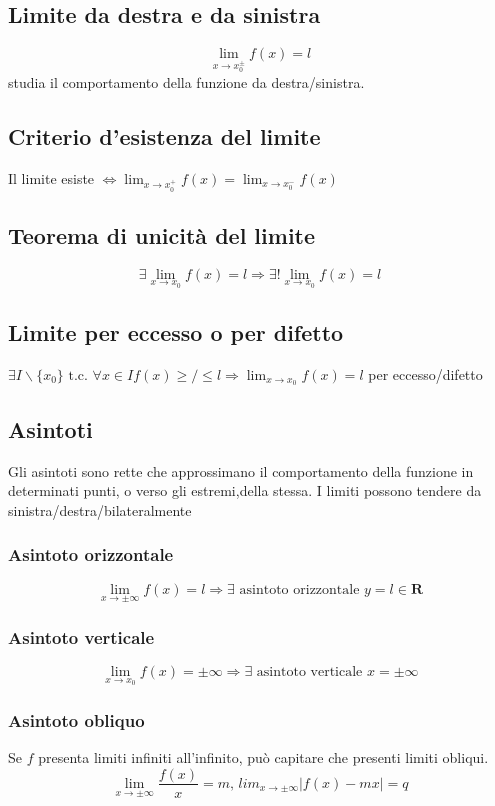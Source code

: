 \documentclass{report}
\begin{document}
    \subsection{Limite da destra e da sinistra}
        $$\lim_{x \to x_0^{\pm}} f\left(x\right) = l$$ studia il comportamento
        della funzione da destra/sinistra.
    \subsection{Criterio d'esistenza del limite}
        Il limite esiste $
            \Longleftrightarrow \lim_{x \to x_0^+} f\left(x\right) = \lim_{x \to x_0^-} f\left(x\right)
        $
    \subsection{Teorema di unicità del limite}
        $$\exists \lim_{x \to x_0} f\left(x\right) = l \Longrightarrow \exists! \lim_{x \to x_0} f\left(x\right) = l$$
    \subsection{Limite per eccesso o per difetto}
        $\exists I\backslash\{x_0\} \textrm{ t.c. } \forall x \in I f\left(x\right) \geq/\leq l \Longrightarrow 
            \lim_{x \to x_0} f\left(x\right) = l$ per eccesso/difetto 
    \subsection{Asintoti}
        Gli asintoti sono rette che approssimano il comportamento della funzione in determinati punti, o verso gli estremi,della stessa.
        I limiti possono tendere da sinistra/destra/bilateralmente
        \subsubsection{Asintoto orizzontale}
            $$\lim_{x \to \pm \infty} f\left(x\right) = l \Longrightarrow \exists \textrm{ asintoto orizzontale } y = l \in \mathbf{R}$$
        \subsubsection{Asintoto verticale}
            $$\lim_{x \to x_0} f\left(x\right) = \pm \infty \Longrightarrow \exists \textrm{ asintoto verticale } x = \pm \infty$$
        \subsubsection{Asintoto obliquo}
            Se $f$ presenta limiti infiniti all'infinito, può capitare che presenti limiti obliqui.
            $$\lim_{x \to \pm \infty} \frac{f\left(x\right)}{x} = m, \, lim_{x \to \pm \infty} |f\left(x\right) - mx| = q$$
\end{document}
